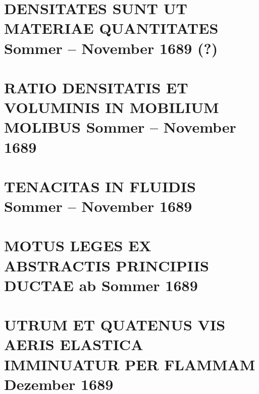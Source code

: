 \documentclass[%
fontsize=10pt,
]{scrbook}
\DeclareRobustCommand{\bracks}[1]{%
\textup{\lbrack}#1\textup{\rbrack}}
\begin{document}
\chapter[tocentry={Densitates sunt ut materiae quantitates
\enskip\bracks{%
Sommer -- November 1689 (?)%
}}, %
head={Densitates sunt ut materiae quantitates}]%
{\MakeUppercase{Densitates sunt ut materiae quantitates}
\newline\bracks{%
Sommer -- November 1689 (?)%
}}%
\label{58216}




\chapter[tocentry={Ratio densitatis et voluminis in mobilium molibus %
\enskip%
\bracks{%
Sommer -- November
1689}}, %
head={Ratio densitatis et voluminis%
}]%
{\MakeUppercase{Ratio densitatis et voluminis in mobilium molibus} %
\newline%
\bracks{%
Sommer -- November
1689}} %
\label{58258}




\chapter[tocentry={Tenacitas in fluidis %
\enskip%
\bracks{%
Sommer -- November
1689}}, %
head={Tenacitas in fluidis%
}]%
{\MakeUppercase{Tenacitas in fluidis} %
\newline%
\bracks{%
Sommer -- November
1689}} %
\label{58218}




\chapter[tocentry={Motus leges ex abstractis principiis ductae %
\enskip%
\bracks{ab
Sommer
1689}%
}, %
head={Motus leges ex abstractis principiis ductae%
}]%
{\MakeUppercase{Motus leges ex abstractis principiis ductae} %
\newline%
\bracks{ab
Sommer
1689}%
} %
\label{60080}




\chapter[tocentry={Utrum et quatenus vis aeris elastica imminuatur per flammam
\enskip \lbrack Dezember 1689\rbrack}, %
head={Utrum vis aeris elastica imminuatur per flammam %
}]%
{\MakeUppercase{Utrum et quatenus vis aeris elastica imminuatur per flammam
}
\newline \lbrack Dezember 1689\rbrack}%
\label{55743+55744+60656}

\end{document}
